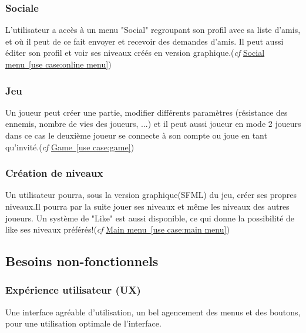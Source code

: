 \documentclass[french]{article}
\begin{document}
\subsubsection{Sociale} L'utilisateur a accès à un menu "Social" regroupant son profil avec sa liste d'amis, et où il peut de ce fait envoyer et recevoir des demandes d'amis. Il peut aussi éditer son profil et voir ses niveaux créés en version graphique.(\textit{cf} \hyperref[use case:online menu]{Social menu~\ref*{use case:online menu}})

\subsubsection{Jeu} Un joueur peut créer une partie, modifier différents paramètres (résistance des ennemis, nombre de vies des joueurs, ...) et il peut aussi joueur en mode 2 joueurs dans ce cas le deuxième joueur se connecte à son compte ou joue en tant qu'invité.(\textit{cf} \hyperref[use case:game]{Game~\ref*{use case:game}})

\subsubsection{Création de niveaux} Un utilisateur pourra, sous la version graphique(SFML) du jeu, créer ses propres niveaux.Il pourra par la suite jouer ses niveaux et même les niveaux des autres joueurs. Un système de "Like" est aussi disponible, ce qui donne la possibilité de like ses niveaux préférés!(\textit{cf} \hyperref[use case:main menu]{Main menu~\ref*{use case:main menu}})

\subsection{Besoins non-fonctionnels}
\subsubsection{Expérience utilisateur (UX)}
Une interface agréable d'utilisation, un bel agencement des menus et des boutons, pour une utilisation optimale de l'interface.
\end{document}
